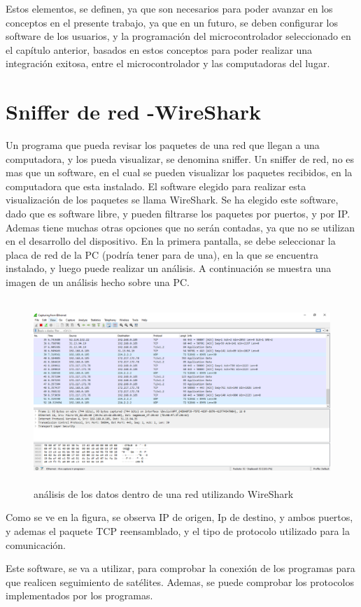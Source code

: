 	Estos elementos, se definen, ya que son necesarios para poder avanzar en los conceptos en el presente trabajo, ya que en un futuro, se deben configurar los software de los usuarios, y la programación del microcontrolador seleccionado en el capítulo anterior, basados en estos conceptos para poder realizar una integración exitosa, entre el microcontrolador y las computadoras del lugar. 
	
\section{Sniffer de red -WireShark} 

Un programa que pueda revisar los paquetes de una red que llegan a una computadora, y los pueda visualizar, se denomina sniffer. Un sniffer de red, no es mas que un software, en el cual se pueden visualizar los paquetes recibidos, en la computadora que esta instalado. El software elegido para realizar esta visualización de los paquetes se llama WireShark. Se ha elegido este software, dado que es software libre, y pueden filtrarse los paquetes por puertos, y por IP. Ademas tiene muchas otras opciones que no serán contadas, ya que no se utilizan en el desarrollo del dispositivo. En la primera pantalla, se debe seleccionar la placa de red de la PC (podría tener para de una), en la que se encuentra instalado, y luego puede realizar un análisis. A continuación se muestra una imagen de un análisis hecho sobre una PC.
\begin{figure}[H]
	\centering 
	\includegraphics[height=7cm]{wireshark}
	\caption{análisis de los datos dentro de una red utilizando WireShark}
\end{figure}


Como se ve en la figura, se observa IP de origen, Ip de destino, y ambos puertos, y ademas el paquete TCP reensamblado, y el tipo de protocolo utilizado para la comunicación.  

Este software, se va a utilizar, para comprobar la conexión de los programas para que realicen seguimiento de satélites. Ademas, se puede comprobar los protocolos implementados por los programas. 

